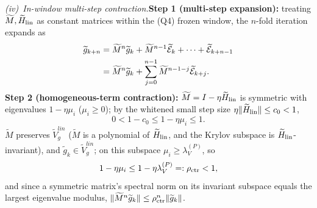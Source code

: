 \documentclass[11pt]{article}
\DeclarePairedDelimiter{\norm}{\lVert}{\rVert}
\newcommand{\Erem}{\mathcal E}
\newcommand{\wt}[1]{\widetilde{#1}}
\numberwithin{equation}{section}
\begin{document}
\medskip
\emph{(iv)~In-window multi-step contraction.}\textbf{Step 1 (multi-step expansion):} treating $\wt M,\wt H_{\rm lin}$ as constant matrices within the (Q4) frozen window, the $n$-fold iteration expands as
\begin{align}
\wt g_{k+n}&=\wt M^n\wt g_k+\wt M^{n-1}\wt\Erem_k+\cdots+\wt\Erem_{k+n-1}\notag\\
&=\wt M^n\wt g_k+\sum_{j=0}^{n-1}\wt M^{n-1-j}\wt\Erem_{k+j}.
\end{align}
\textbf{Step 2 (homogeneous-term contraction):} $\wt M=I-\eta\wt H_{\rm lin}$ is symmetric with eigenvalues $1-\eta\mu_i$ ($\mu_i\ge0$); by the whitened small step size $\eta\norm{\wt H_{\rm lin}}\le c_0<1$,
\begin{equation}
0<1-c_0\le1-\eta\mu_i\le1.
\end{equation}
$\wt M$ preserves $\wt V_g^{lin}$ ($\wt M$ is a polynomial of $\wt H_{\rm lin}$, and the Krylov subspace is $\wt H_{\rm lin}$-invariant), and $\wt g_k\in\wt V_g^{lin}$; on this subspace $\mu_i\ge\lambda_V^{(P)}$, so
\begin{equation}
1-\eta\mu_i\le1-\eta\lambda_V^{(P)}=:\rho_{\rm ctr}<1,
\end{equation}
and since a symmetric matrix's spectral norm on its invariant subspace equals the largest eigenvalue modulus, $\norm{\wt M^n\wt g_k}\le\rho_{\rm ctr}^n\norm{\wt g_k}$.
\end{document}
